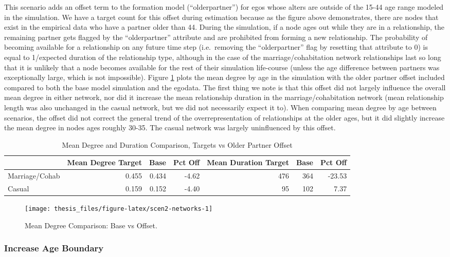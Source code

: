 \documentclass [11pt, proquest] {uwthesis}[2015/03/03]
\begin{document}
This scenario adds an offset term to the formation model (``olderpartner'') for egos whose alters are outside of the 15-44 age range modeled in the simulation. We have a target count for this offset during estimation because as the figure above demonstrates, there are nodes that exist in the empirical data who have a partner older than 44. During the simulation, if a node ages out while they are in a relationship, the remaining partner gets flagged by the ``olderpartner'' attribute and are prohibited from forming a new relationship. The probability of becoming available for a relationship on any future time step (i.e.~removing the ``olderpartner'' flag by resetting that attribute to 0) is equal to 1/expected duration of the relationship type, although in the case of the marriage/cohabitation network relationships last so long that it is unlikely that a node becomes available for the rest of their simulation life-course (unless the age difference between partners was exceptionally large, which is not impossible). Figure \ref{fig:scen2-networks} plots the mean degree by age in the simulation with the older partner offset included compared to both the base model simulation and the egodata. The first thing we note is that this offset did not largely influence the overall mean degree in either network, nor did it increase the mean relationship duration in the marriage/cohabitation network (mean relationship length was also unchanged in the casual network, but we did not necessarily expect it to). When comparing mean degree by age between scenarios, the offset did not correct the general trend of the overrepresentation of relationships at the older ages, but it did slightly increase the mean degree in nodes ages roughly 30-35. The casual network was largely uninfluenced by this offset.
\begin{table}

\caption{\label{tab:scen2-networks}Mean Degree and Duration Comparison, Targets vs Older Partner Offset}
\centering
\begin{tabular}[t]{lrrrrrr}
\toprule
  & Mean Degree Target & Base & Pct Off & Mean Duration Target & Base & Pct Off\\
\midrule
Marriage/Cohab & 0.455 & 0.434 & -4.62 & 476 & 364 & -23.53\\
Casual & 0.159 & 0.152 & -4.40 & 95 & 102 & 7.37\\
\bottomrule
\end{tabular}
\end{table}
\begin{figure}

{\centering \texttt{[image: thesis\_files/figure-latex/scen2-networks-1]} 

}

\caption{Mean Degree Comparison: Base vs Offset.}\label{fig:scen2-networks}
\end{figure}
\hypertarget{increase-age-boundary}{%
\subsubsection{Increase Age Boundary}\label{increase-age-boundary}}
\end{document}

